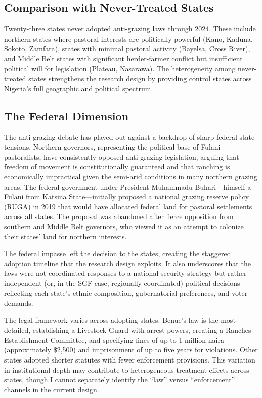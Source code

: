 \documentclass[12pt]{article}
\begin{document}
\subsection{Comparison with Never-Treated States}

Twenty-three states never adopted anti-grazing laws through 2024. These include northern states where pastoral interests are politically powerful (Kano, Kaduna, Sokoto, Zamfara), states with minimal pastoral activity (Bayelsa, Cross River), and Middle Belt states with significant herder-farmer conflict but insufficient political will for legislation (Plateau, Nasarawa). The heterogeneity among never-treated states strengthens the research design by providing control states across Nigeria's full geographic and political spectrum.

\subsection{The Federal Dimension}

The anti-grazing debate has played out against a backdrop of sharp federal-state tensions. Northern governors, representing the political base of Fulani pastoralists, have consistently opposed anti-grazing legislation, arguing that freedom of movement is constitutionally guaranteed and that ranching is economically impractical given the semi-arid conditions in many northern grazing areas. The federal government under President Muhammadu Buhari---himself a Fulani from Katsina State---initially proposed a national grazing reserve policy (RUGA) in 2019 that would have allocated federal land for pastoral settlements across all states. The proposal was abandoned after fierce opposition from southern and Middle Belt governors, who viewed it as an attempt to colonize their states' land for northern interests.

The federal impasse left the decision to the states, creating the staggered adoption timeline that the research design exploits. It also underscores that the laws were not coordinated responses to a national security strategy but rather independent (or, in the SGF case, regionally coordinated) political decisions reflecting each state's ethnic composition, gubernatorial preferences, and voter demands.

The legal framework varies across adopting states. Benue's law is the most detailed, establishing a Livestock Guard with arrest powers, creating a Ranches Establishment Committee, and specifying fines of up to 1 million naira (approximately \$2,500) and imprisonment of up to five years for violations. Other states adopted shorter statutes with fewer enforcement provisions. This variation in institutional depth may contribute to heterogeneous treatment effects across states, though I cannot separately identify the ``law'' versus ``enforcement'' channels in the current design.
\end{document}
